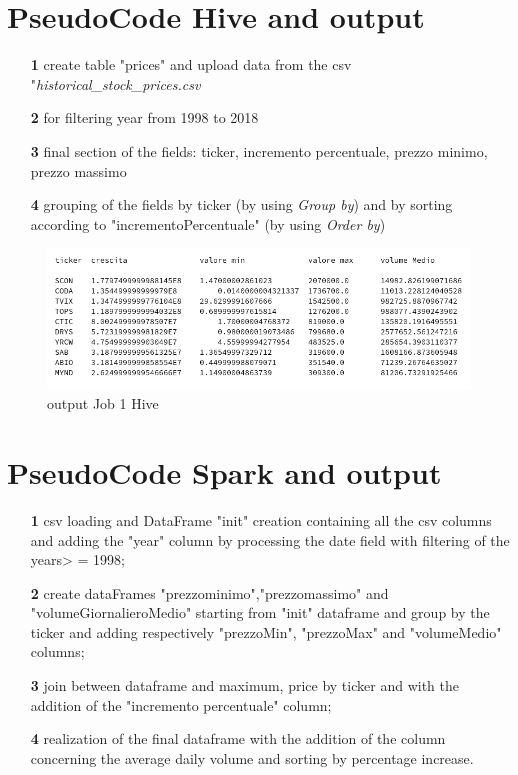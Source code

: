 \documentclass[]{report}
\begin{document}
\section*{PseudoCode Hive and output}
	\begin{itemize}
		\item[\textbf{1}] create table "prices" and upload data from the csv "\textit{historical\_stock\_prices.csv}
		\item[\textbf{2}] for filtering year from 1998 to 2018
		\item[\textbf{3}] final section of the fields: ticker, incremento percentuale, prezzo minimo, prezzo massimo 
		\item[\textbf{4}] grouping of the fields by ticker (by using \textit{Group by}) and by sorting according to "incrementoPercentuale" (by using \textit{Order by})
	\end{itemize}
\begin{center}
	\begin{figure}[!htb]
		\hspace{-1 cm}
		\includegraphics[width=1.2 \linewidth]{figure/output1hive}
		\caption{output Job 1 Hive}
	\end{figure}
\end{center}

\section*{PseudoCode Spark and output }
\begin{itemize}
	\item[\textbf{1}] csv loading and DataFrame "init" creation containing all the csv columns and adding the "year" column by processing the date field with filtering of the years> = 1998;
	\item[\textbf{2}] create dataFrames "prezzominimo","prezzomassimo" and "volumeGiornalieroMedio" starting from "init" dataframe and group by the ticker and adding respectively "prezzoMin", "prezzoMax" and "volumeMedio" columns;
	\item[\textbf{3}] join between dataframe and maximum, price by ticker and with the addition of the "incremento percentuale" column;
	\item[\textbf{4}] realization of the final dataframe with the addition of the column concerning the average daily volume and sorting by percentage increase.
\end{itemize}
\end{document}
